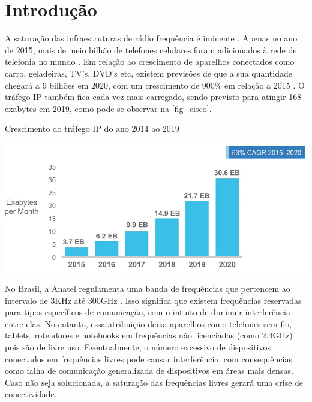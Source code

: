 	\chapter*[Introdução]{Introdução} %
		
	A saturação das infraestruturas de rádio frequência é iminente \cite{load-balancing}. Apenas no ano de 2015, mais de meio bilhão de telefones celulares foram adicionados à rede de telefonia no mundo \cite{cisco-forecast}. Em relação ao crescimento de aparelhos conectados como carro, geladeiras, TV’s, DVD’s etc, existem previsões de que a sua quantidade chegará a 9 bilhões em 2020, com um crescimento de 900\% em relação a 2015 \cite{erricson-report}. O tráfego IP também fica cada vez mais carregado, sendo previsto para atingir 168 exabytes em 2019, como pode-se observar na \autoref{fig_cisco}.
	
	\begin{chart}[ht!]
		\caption{\label{fig_cisco}Crescimento do tráfego IP do ano 2014 ao 2019}
		\begin{center}
			\includegraphics[scale=0.5]{cisco_exabytes_per_month.png}
		\end{center}
	\end{chart}
	
	No Brasil, a Anatel regulamenta uma banda de frequências que pertencem ao intervalo  de 3KHz até 300GHz \cite{faixa-anatel}. Isso significa que existem frequências reservadas para tipos específicos de comunicação, com o intuito de diminuir interferência entre elas. No entanto, essa atribuição deixa aparelhos como telefones sem fio, tablets, roteadores e notebooks em frequências não licenciadas (como 2.4GHz) pois são de livre uso. Eventualmente, o número excessivo de dispositivos conectados em  frequências livres pode causar interferência, com consequências como falha de comunicação generalizada de dispositivos em áreas mais densas. Caso não seja solucionada, a saturação das frequências livres gerará uma crise de conectividade. \par 
	
